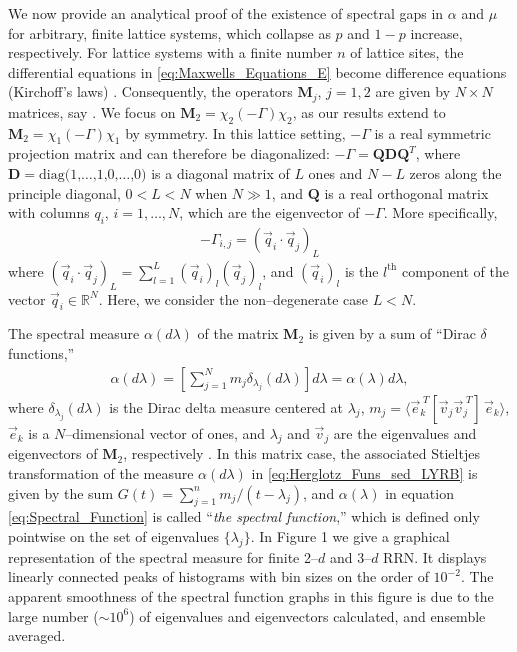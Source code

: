 \documentclass[english,12pt,jmp,graphicx]{revtex4-1}
\begin{document}
We now provide an analytical proof of the existence of spectral gaps
in $\alpha$ and $\mu$ for arbitrary, finite lattice systems, which collapse
as $p$ and $1-p$ increase, respectively. For lattice systems with a
finite number $n$ of lattice sites, the differential equations in
\eqref{eq:Maxwells_Equations_E} become difference equations
(Kirchoff's laws) \cite{Golden:JMP-5627}. Consequently, the operators 
$\mathbf{M}_j$, $j=1,2$ are given by $N\times N$ matrices, say
\cite{Golden:JoB:337,Golden:JMP-5627}. We focus on
$\mathbf{M}_2=\chi_2(-\Gamma)\chi_2$, as our results extend to
$\mathbf{M}_2=\chi_1(-\Gamma)\chi_1$ by symmetry. In this lattice setting, $-\Gamma$
is a real symmetric projection matrix and can therefore be diagonalized:
$-\Gamma=\mathbf{Q}\mathbf{D}\mathbf{Q}^T$, where 
$\mathbf{D}=\text{diag(1,\ldots,1,0,\ldots,0)}$ is a diagonal matrix of $L$ ones
and $N-L$ zeros along the principle diagonal, $0<L<N$ when $N\gg1$, and
$\mathbf{Q}$ is a real orthogonal matrix with columns $q_i$,
$i=1,\ldots,N$, which are the eigenvector of $-\Gamma$. More specifically,
%
\begin{align*}
  -\Gamma_{i,j}=(\vec{q}_i\cdot\vec{q}_j)_L
\end{align*}
%
where 
$(\vec{q}_i\cdot\vec{q}_j)_L=\sum_{l=1}^L(\vec{q}_i)_l(\vec{q}_j)_l$, and
$(\vec{q}_i)_l$ is the $l^{\text{th}}$ component of the vector
$\vec{q}_i\in\mathbb{R}^N$. Here, we consider the non--degenerate case $L<N$.   

The spectral measure $\alpha(d\lambda)$ of the matrix $\mathbf{M}_2$ is given by
a sum of ``Dirac $\delta$ functions,''
%
\begin{align}\label{eq:Spectral_Function}
  \alpha(d\lambda)=
    \left[\sum_{j=1}^N m_j \delta_{\lambda_j}(d\lambda)\right]d\lambda
      =\alpha(\lambda)d\lambda,
\end{align}
%
where $\delta_{\lambda_j}(d\lambda)$ is the Dirac delta measure centered at $\lambda_j$,
$m_j=\langle\vec{e}_k^{\;T}[\vec{v}_j\vec{v}_j^{\;T}]\,\vec{e}_k\rangle$, 
$\vec{e}_k$ is a $N$--dimensional vector of ones, and $\lambda_j$ and
$\vec{v}_j$ are the eigenvalues and eigenvectors of $\mathbf{M}_2$,
respectively \cite{Golden:JoB:337}. In this matrix case, the
associated Stieltjes transformation of the measure $\alpha(d\lambda)$
in \eqref{eq:Herglotz_Funs_sed_LYRB} is 
given by the sum $G(t)=\sum_{j=1}^nm_j/(t-\lambda_j)$, and $\alpha(\lambda)$ in equation
\eqref{eq:Spectral_Function} is called ``\emph{the spectral
  function},'' which is defined only pointwise on the set of
eigenvalues $\{\lambda_j\}$. In Figure 1 we give a graphical
representation of the spectral measure for finite 2--$d$ and 3--$d$
RRN. It displays linearly connected peaks of histograms with bin
sizes on the order of $10^{-2}$. The apparent smoothness of the
spectral function graphs in this figure is due to the large number
($\sim10^6$) of eigenvalues and eigenvectors calculated, and ensemble
averaged. 
\end{document}

